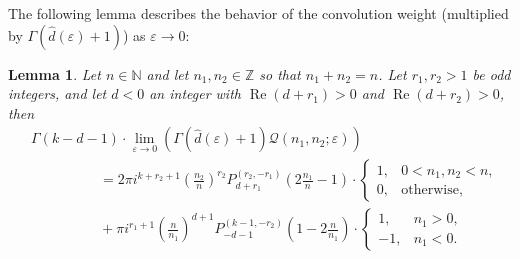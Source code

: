 \documentclass[]{article}
\newtheorem{lemma}[thm]{Lemma}
\renewcommand{\Re}{\operatorname{Re}}
\begin{document}
The following lemma describes the behavior of the convolution weight (multiplied by $\Gamma(\hat d(\varepsilon) +1   ) $) as $\varepsilon \to 0$: 
\begin{lemma} Let $n \in \mathbb{N}$ and let  $n_1,n_2\in\mathbb{Z}$ so that $n_1+n_2=n$. Let $r_1,r_2>1$ be odd integers, and let $d<0 $ an integer with $\Re(d+r_1) > 0$ and $\Re(d+r_2) > 0$, then 
\begin{equation}\label{eq:limitQ}
    \begin{split}
&  \Gamma(k-d-1) \cdot \lim_{\varepsilon \to 0} \left(  \Gamma(\hat d(\varepsilon) +1   )      \mathcal{Q}(n_1,n_2; \varepsilon)  \right) \\
& \ \ \ \ \ \ \ \ \ \ \ \ \ \ \ \ \ \ \ \ \ \ =    2  \pi i^{k+r_2+1}   \left( \frac{n_2}{n}  \right)^{r_2}  P_{d+r_1}^{(r_2,-r_1)}\left(2\tfrac{ n_1}{n}-1\right) \cdot \begin{cases}
    1  , & 0 < n_1, n_2 < n, \\
    0, & \text{otherwise},
\end{cases}
\\
& \ \ \ \ \ \ \ \ \ \ \  \ \ \ \ \ \ \ \ \ \ \ +      \pi i^{ r_1+1 }   \left(\frac{n}{n_1}\right)^{ d+1}   P^{  (k-1, -r_2) }_{-d-1} (1-2 \tfrac{n}{n_1}) \cdot \begin{cases}
    1  , & n_1 > 0, \\
    -1, & n_1 < 0.
\end{cases}
    \end{split}
\end{equation}


\end{lemma}
\end{document}

